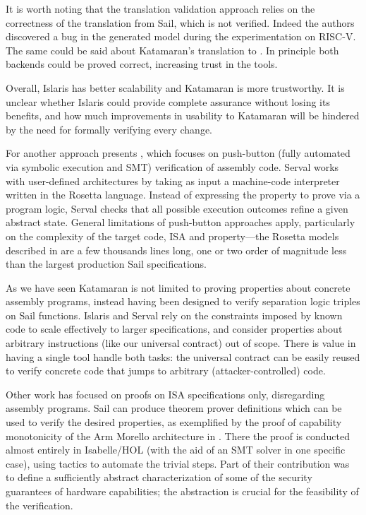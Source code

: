 It is worth noting that the translation validation approach relies on the correctness of the translation from Sail, which is not verified. Indeed the authors discovered a bug in the generated model during the experimentation on RISC-V. The same could be said about Katamaran's translation to \usail. In principle both backends could be proved correct, increasing trust in the tools.

Overall, Islaris has better scalability and Katamaran is more trustworthy. It is unclear whether Islaris could provide complete assurance without losing its benefits, and how much improvements in usability to Katamaran will be hindered by the need for formally verifying every change.

For another approach \cite{Nelson2019} presents , which focuses on push-button (\ie fully automated via symbolic execution and SMT) verification of assembly code. Serval works with user-defined architectures by taking as input a machine-code interpreter written in the Rosetta language. Instead of expressing the property to prove via a program logic, Serval checks that all possible execution outcomes refine a given abstract state. General limitations of push-button approaches apply, particularly on the complexity of the target code, ISA and property---the Rosetta models described in \cite{Nelson2019} are a few thousands lines long, one or two order of magnitude less than the largest production Sail specifications.

As we have seen Katamaran is not limited to proving properties about concrete assembly programs, instead having been designed to verify separation logic triples on Sail functions. Islaris and Serval rely on the constraints imposed by known code to scale effectively to larger specifications, and consider properties about arbitrary instructions (like our universal contract) out of scope. There is value in having a single tool handle both tasks: the universal contract can be easily reused to verify concrete code that jumps to arbitrary (attacker-controlled) code.

Other work has focused on proofs on ISA specifications only, disregarding assembly programs. Sail can produce theorem prover definitions which can be used to verify the desired properties, as exemplified by the proof of capability monotonicity of the Arm Morello architecture in \cite{Bauereiss2022}. There the proof is conducted almost entirely in Isabelle/HOL (with the aid of an SMT solver in one specific case), using tactics to automate the trivial steps. Part of their contribution was to define a sufficiently abstract characterization of some of the security guarantees of hardware capabilities; the abstraction is crucial for the feasibility of the verification.

